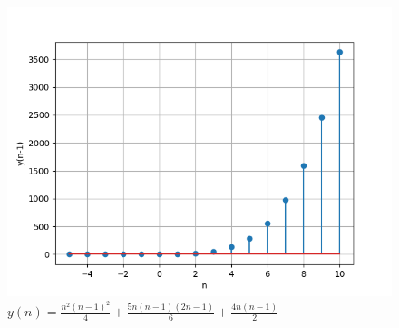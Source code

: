 \documentclass[journal,12pt,onecolumn]{IEEEtran}
\theoremstyle{remark}
\begin{document}
    \begin{figure}[!h] 
    \centering
    \includegraphics[width=\columnwidth]{figs/sumplot.png}
    \caption{$y(n)=\frac{n^2(n-1)^2}{4} + \frac{5n(n-1)(2n-1)}{6} + \frac{4n(n-1)}{2}$}
    \label{fig:Graph1_math.11.9.4.8}
    \end{figure}
\end{document}
